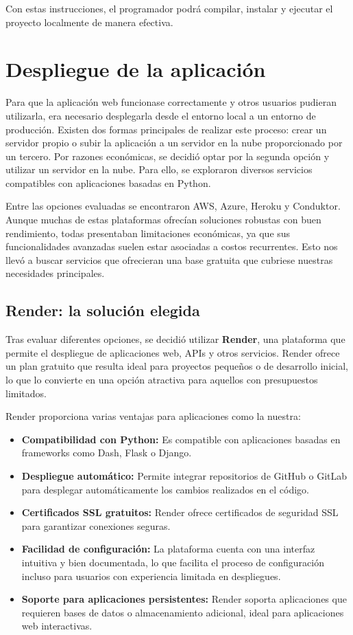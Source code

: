 Con estas instrucciones, el programador podrá compilar, instalar y ejecutar el proyecto localmente de manera efectiva.

\section{Despliegue de la aplicación}

Para que la aplicación web funcionase correctamente y otros usuarios pudieran utilizarla, era necesario desplegarla desde el entorno local a un entorno de producción. Existen dos formas principales de realizar este proceso: crear un servidor propio o subir la aplicación a un servidor en la nube proporcionado por un tercero. Por razones económicas, se decidió optar por la segunda opción y utilizar un servidor en la nube. Para ello, se exploraron diversos servicios compatibles con aplicaciones basadas en Python.

Entre las opciones evaluadas se encontraron AWS, Azure, Heroku y Conduktor. Aunque muchas de estas plataformas ofrecían soluciones robustas con buen rendimiento, todas presentaban limitaciones económicas, ya que sus funcionalidades avanzadas suelen estar asociadas a costos recurrentes. Esto nos llevó a buscar servicios que ofrecieran una base gratuita que cubriese nuestras necesidades principales.

\subsection{Render: la solución elegida}

Tras evaluar diferentes opciones, se decidió utilizar \textbf{Render}, una plataforma que permite el despliegue de aplicaciones web, APIs y otros servicios. Render ofrece un plan gratuito que resulta ideal para proyectos pequeños o de desarrollo inicial, lo que lo convierte en una opción atractiva para aquellos con presupuestos limitados.

Render proporciona varias ventajas para aplicaciones como la nuestra:
\begin{itemize}
    \item \textbf{Compatibilidad con Python:} Es compatible con aplicaciones basadas en frameworks como Dash, Flask o Django.
    \item \textbf{Despliegue automático:} Permite integrar repositorios de GitHub o GitLab para desplegar automáticamente los cambios realizados en el código.
    \item \textbf{Certificados SSL gratuitos:} Render ofrece certificados de seguridad SSL para garantizar conexiones seguras.
    \item \textbf{Facilidad de configuración:} La plataforma cuenta con una interfaz intuitiva y bien documentada, lo que facilita el proceso de configuración incluso para usuarios con experiencia limitada en despliegues.
    \item \textbf{Soporte para aplicaciones persistentes:} Render soporta aplicaciones que requieren bases de datos o almacenamiento adicional, ideal para aplicaciones web interactivas.
\end{itemize}

